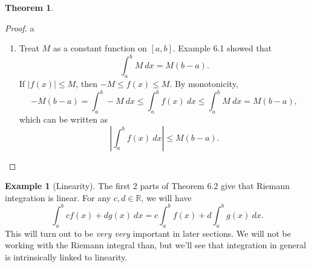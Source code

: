 \documentclass{article}
\newcommand{\R}{\mathbb{R}}
\theoremstyle{definition}
\newtheorem{theorem}{Theorem}[section]
\newtheorem{example}{Example}[section]
\begin{document}
\begin{theorem}
\begin{proof}{\color{white}a}
\begin{enumerate}
	\begin{align*}
		U(P^*,f)=U(Q,f)+U(R,f),\\
		L(P^*,f)=L(Q,f)+L(R,f).
	\end{align*}
	We can conclude \begin{align*}
		U(Q,f)-L(Q,f)=U(P^*,f)-L(P^*,f)-[U(R,f)-L(R,f)]\le U(P,f)-L(P,f)<\varepsilon,\\
			U(R,f)-L(R,f)=U(P^*,f)-L(P^*,f)-[U(Q,f)-L(Q,f)]\le U(P,f)-L(P,f)<\varepsilon.
	\end{align*}
	This shows that $ f $ is integrable on $ [a,c] $ and $ [c,b] $ by Riemann's Criterion.
	
	We have 
	\begin{align*}
		\int_{a}^{b}f(x)\ dx\le U(P,f)=U(Q,f)+U(R,f)< L(Q,f)+L(R,f)+\varepsilon< \int_{a}^{c}f(x)\ dx+\int_{c}^{b}f(x)\ dx+\varepsilon,\\
		\int_{a}^{b}f(x)\ dx\ge U(P,f)=U(Q,f)+U(R,f)> U(Q,f)+U(R,f)-\varepsilon> \int_{a}^{c}f(x)\ dx+\int_{c}^{b}f(x)\ dx-\varepsilon,
	\end{align*}
	which combine to give
	$$ \int_{a}^{c}f(x)\ dx+\int_{c}^{b}f(x)\ dx-\varepsilon<\int_{a}^{b}f(x)\ dx< \int_{a}^{c}f(x)\ dx+\int_{c}^{b}f(x)\ dx+\varepsilon.$$ If this for all $ \varepsilon>0 $, then $$\int_{a}^{b}f(x)\ dx=\int_{a}^{c}f(x)\ dx+\int_{c}^{b}f(x)\ dx $$
	\item Treat $ M $ as a constant function on $ [a,b] $. Example 6.1 showed that $$\int_{a}^{b}M\ dx=M(b-a). $$ If $ |f(x)|\le M $, then $ -M\le f(x)\le M $. By monotonicity, $$-M(b-a)=\int_{a}^{b}-M\ dx\le \int_{a}^{b}f(x)\ dx\le \int_{a}^{b}M\ dx=M(b-a), $$ which can be written as $$ \left\lvert\int_{a}^{b}f(x)\ dx \right\rvert\le M(b-a) .$$
	\end{enumerate}

\end{proof}
\end{theorem}
\begin{example}[Linearity]
The first 2 parts of Theorem 6.2 give that Riemann integration is linear. For any $ c,d\in\R $, we will have $$\int_{a}^{b}cf(x)+dg(x)\ dx=c\int_{a}^{b}f(x)+d\int_{a}^{b}g(x)\ dx .$$ This will turn out to be \textit{very very} important in later sections. We will not be working with the Riemann integral than, but we'll see that integration in general is intrinsically linked to linearity. 
\end{example}
\end{document}
